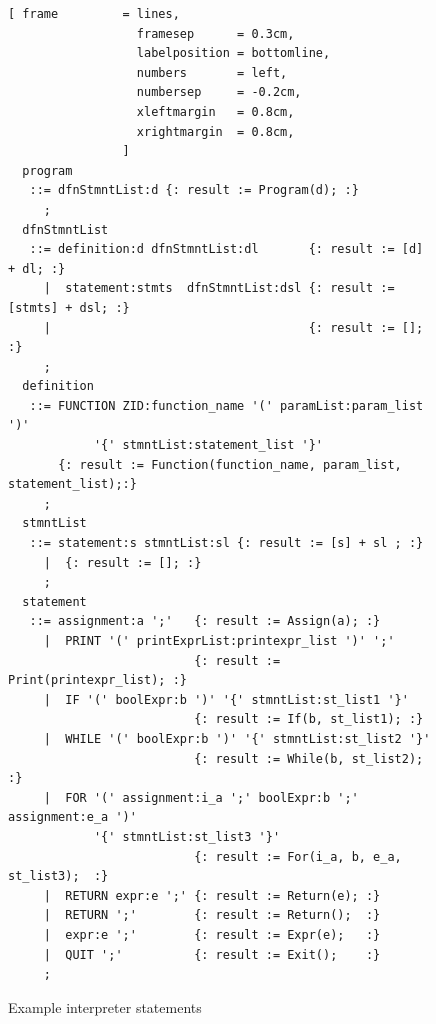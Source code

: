\begin{figure}[!ht]

\begin{Verbatim}[ frame         = lines, 
                  framesep      = 0.3cm, 
                  labelposition = bottomline,
                  numbers       = left,
                  numbersep     = -0.2cm,
                  xleftmargin   = 0.8cm,
                  xrightmargin  = 0.8cm,
                ]
  program 
   ::= dfnStmntList:d {: result := Program(d); :}
     ;
  dfnStmntList 
   ::= definition:d dfnStmntList:dl       {: result := [d] + dl; :}
     |  statement:stmts  dfnStmntList:dsl {: result := [stmts] + dsl; :}
     |                                    {: result := []; :}
     ;
  definition 
   ::= FUNCTION ZID:function_name '(' paramList:param_list ')' 
			'{' stmntList:statement_list '}'
       {: result := Function(function_name, param_list, statement_list);:}
     ;
  stmntList
   ::= statement:s stmntList:sl {: result := [s] + sl ; :}
     |  {: result := []; :}
     ;
  statement 
   ::= assignment:a ';'   {: result := Assign(a); :}    
     |  PRINT '(' printExprList:printexpr_list ')' ';'      
                          {: result := Print(printexpr_list); :}
     |  IF '(' boolExpr:b ')' '{' stmntList:st_list1 '}'    
                          {: result := If(b, st_list1); :}
     |  WHILE '(' boolExpr:b ')' '{' stmntList:st_list2 '}' 
                          {: result := While(b, st_list2); :}
     |  FOR '(' assignment:i_a ';' boolExpr:b ';' assignment:e_a ')' 
		    '{' stmntList:st_list3 '}' 
                          {: result := For(i_a, b, e_a, st_list3);  :}
     |  RETURN expr:e ';' {: result := Return(e); :}
     |  RETURN ';'        {: result := Return();  :}
     |  expr:e ';'        {: result := Expr(e);   :}      
     |  QUIT ';'          {: result := Exit();    :}
     ;
\end{Verbatim}
\caption{Example interpreter statements}
\label{fig:example_interpreter_grammar_statements}
\end{figure}

